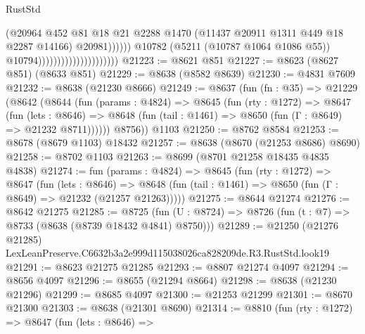 \begin{lexlean}{RustStd}
\begin{coremodule}
                                                        (@20964
                                                          @452
                                                          @81
                                                          @18
                                                          @21
                                                          @2288
                                                          @1470
                                                          (@11437
                                                            @20911
                                                            @1311
                                                            @449
                                                            @18
                                                            @2287
                                                            @14166)
                                                          @20981))))))
                                              @10782
                                              (@5211 (@10787 @1064 @1086 @55))
                                              @10794)))))))))))))))))))))
@21223 := @8621 @851
@21227 := @8623 (@8627 @851) (@8633 @851)
@21229 := @8638 (@8582 @8639)
@21230 := @4831 @7609
@21232 := @8638 (@21230 @8666)
@21249 := @8637
    (fun (fn : @35) =>
    @21229
      (@8642
        (@8644
          (fun (params : @4824) =>
          @8645
            (fun (rty : @1272) =>
            @8647
              (fun (lets : @8646) =>
              @8648 (fun (tail : @1461) => @8650 (fun (Γ : @8649) => @21232 @8711))))))
        @8756))
    @1103
@21250 := @8762 @8584
@21253 := @8678 (@8679 @1103) @18432
@21257 := @8638 (@8670 (@21253 @8686) @8690)
@21258 := @8702 @1103
@21263 := @8699 (@8701 @21258 @18435 @4835 @4838)
@21274 := fun (params : @4824) =>
  @8645
    (fun (rty : @1272) =>
    @8647
      (fun (lets : @8646) =>
      @8648 (fun (tail : @1461) => @8650 (fun (Γ : @8649) => @21232 (@21257 @21263)))))
@21275 := @8644 @21274
@21276 := @8642 @21275
@21285 := @8725
    (fun (U : @8724) => @8726 (fun (t : @7) => @8733 (@8638 (@8739 @18432 @4841) @8750)))
@21289 := @21250 (@21276 @21285) LexLeanPreserve.C6632b3a2e999d115038026ca828209de.R3.RustStd.look19
@21291 := @8623 @21275 @21285
@21293 := @8807 @21274 @4097
@21294 := @8656 @4097
@21296 := @8655 (@21294 @8664)
@21298 := @8638 (@21230 @21296)
@21299 := @8685 @4097
@21300 := @21253 @21299
@21301 := @8670 @21300
@21303 := @8638 (@21301 @8690)
@21314 := @8810
    (fun (rty : @1272) =>
    @8647
      (fun (lets : @8646) =>

\end{coremodule}
\end{lexlean}
